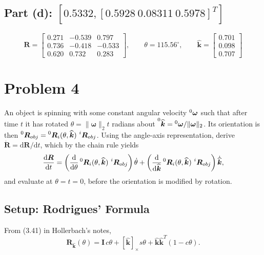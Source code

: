 \documentclass[11pt]{article}
\newcommand{\R}{\bm{R}}
\newcommand{\khat}{\widehat{\bm{k}}}
\newcommand{\wvec}{\bm{\omega}}
\newcommand{\skewx}[1]{\left[#1\right]_{\times}}
\begin{document}
\subsection*{Part (d): $[0.5332,[0.5928\ 0.08311\ 0.5978]^{T}]$}
\begin{result}
\[
    \R = \begin{bmatrix}
        0.271 & -0.539 & 0.797\\
        0.736 & -0.418 & -0.533\\
        0.620 & 0.732 & 0.283
    \end{bmatrix}, \qquad
    \theta = 115.56^\circ, \qquad \khat = \begin{bmatrix}0.701\\ 0.098\\ 0.707\end{bmatrix}
\]
\end{result}

\section*{Problem 4}

\begin{statement}
An object is spinning with some constant angular velocity $\prescript{0}{}{\wvec}$ such that after time $t$ it has rotated $\theta = \lVert\wvec\rVert_{2}t$ radians about $\prescript{0}{}{\khat} = \prescript{0}{}{\wvec}/\lVert\wvec\rVert_{2}$. Its orientation is then $\prescript{0}{}{\R}_{obj} = \prescript{0}{}{\R}_{i}(\theta,\khat)\,\prescript{i}{}{\R}_{obj}$. Using the angle-axis representation, derive $\dot{\R} = \mathrm{d}\R/\mathrm{d}t$, which by the chain rule yields
\[
    \frac{\mathrm{d}\R}{\mathrm{d}t} = \left(\frac{\mathrm{d}}{\mathrm{d}\theta}\prescript{0}{}{\R}_{i}(\theta,\khat)\,\prescript{i}{}{\R}_{obj}\right)\dot{\theta}
    + \left(\frac{\mathrm{d}}{\mathrm{d}\khat}\prescript{0}{}{\R}_{i}(\theta,\khat)\,\prescript{i}{}{\R}_{obj}\right)\dot{\khat},
\]
and evaluate at $\theta = t = 0$, before the orientation is modified by rotation.
\end{statement}

\subsection*{Setup: Rodrigues' Formula}
From (3.41) in Hollerbach's notes,
\[
    \R_{\khat}(\theta) = \bm I\,c\theta + \skewx{\khat}s\theta + \khat\khat^{T}(1-c\theta).
\]
\end{document}
